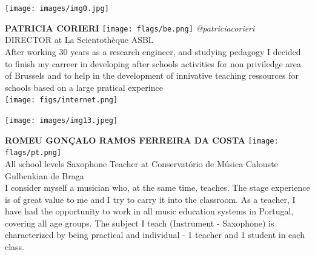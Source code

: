 \documentclass[11pt]{article}
\begin{document}
\noindent
\begin{minipage}{0.3\textwidth}
\centering
\texttt{[image: images/img0.jpg]}
\end{minipage}
\hfill
\begin{minipage}{0.6\textwidth}\raggedright
\color{color1}\uppercase{\textbf{Patricia Corieri}}
\color{color2}\hspace{0.2cm}\texttt{[image: flags/be.png]}
\hspace{0.2cm}\textit{@patriciacorieri}
\\
DIRECTOR at La Scientothèque ASBL\\
{\footnotesize After working 30 years as a research engineer, and studying pedagogy I decided  to finish my carreer in developing after schools activities for non priviledge area of Brussels and to help in the development of innivative teaching ressources for schools based on a large pratical experince}\\
\texttt{[image: figs/internet.png]}
\end{minipage}
\newline\newline\newline

\noindent
\begin{minipage}{0.3\textwidth}
\centering
\texttt{[image: images/img13.jpeg]}
\end{minipage}
\hfill
\begin{minipage}{0.6\textwidth}\raggedright
\color{color1}\uppercase{\textbf{Romeu Gonçalo Ramos Ferreira da Costa}}
\color{color2}\hspace{0.2cm}\texttt{[image: flags/pt.png]}
\\
All school levels Saxophone Teacher at Conservatório de Música Calouste Gulbenkian de Braga\\
{\footnotesize I consider myself a musician who, at the same time, teaches. The stage experience is of great value to me and I try to carry it into the classroom. As a teacher, I have had the opportunity to work in all music education systems in Portugal, covering all age groups. The subject I teach (Instrument - Saxophone) is characterized by being practical and individual - 1 teacher and 1 student in each class.}\\
\end{minipage}
\newline\newline\newline
\end{document}
